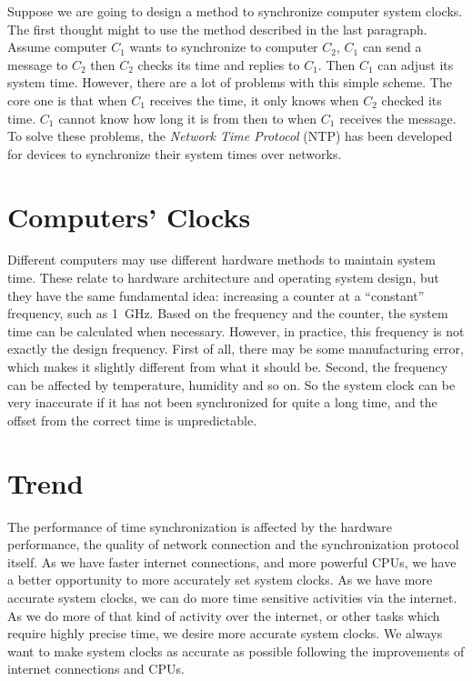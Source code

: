 Suppose we are going to design a method to synchronize computer system clocks.
The first thought might to use the method described in the last paragraph.
Assume computer $C_1$ wants to synchronize to computer $C_2$, $C_1$ can
send a message to $C_2$ then $C_2$ checks its time and replies to $C_1$. Then
$C_1$ can adjust its system time.  However, there are a lot of problems with
this simple scheme. The core one is that when $C_1$ receives the time, it only
knows when $C_2$ checked its time. $C_1$ cannot know how long it is from then
to when $C_1$ receives the message. To solve these problems, the \emph{Network
Time Protocol} (NTP) has been developed for devices to synchronize their system
times over networks. 

\section{Computers' Clocks}
\label{sec:computers_clocks}
Different computers may use different hardware methods to maintain system time.
These relate to hardware architecture and operating system design, but they
have the same fundamental idea: increasing a counter at a ``constant''
frequency, such as 1~GHz. Based on the frequency and the counter, the system
time can be calculated when necessary. However, in practice, this frequency is
not exactly the design frequency.  First of all, there may be some
manufacturing error, which makes it slightly different from what it should be.
Second, the frequency can be affected by temperature, humidity and so on. So
the system clock can be very inaccurate if it has not been synchronized for
quite a long time, and the offset from the correct time is unpredictable.

\section{Trend}
\label{sec:trend}
The performance of time synchronization is affected by the hardware
performance, the quality of network connection and the synchronization protocol
itself. 
As we have faster internet connections, and more powerful CPUs, we have a
better opportunity to more accurately set system clocks. As we have more
accurate system clocks, we can do more time sensitive activities via the internet.
As we do more of that kind of activity over the internet, or
other tasks which require highly precise time, we desire more accurate
system clocks.  We always want to make system clocks as accurate as possible
following the improvements of internet connections and CPUs. 

